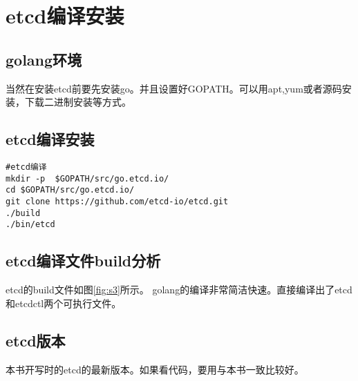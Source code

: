 
\mylineskip
\chapter{etcd编译安装}\label{chaper:ch1}
\section{golang环境}
当然在安装etcd前要先安装go。并且设置好GOPATH。可以用apt,yum或者源码安装，下载二进制安装等方式。

\section{etcd编译安装}
\begin{verbatim}
#etcd编译
mkdir -p  $GOPATH/src/go.etcd.io/
cd $GOPATH/src/go.etcd.io/
git clone https://github.com/etcd-io/etcd.git
./build
./bin/etcd
\end{verbatim}


\section{etcd编译文件build分析}
	etcd的build文件如图\ref{fig:s3}所示。 golang的编译非常简洁快速。直接编译出了etcd和etcdctl两个可执行文件。


\section{etcd版本}
	本书开写时的etcd的最新版本。如果看代码，要用与本书一致比较好。
